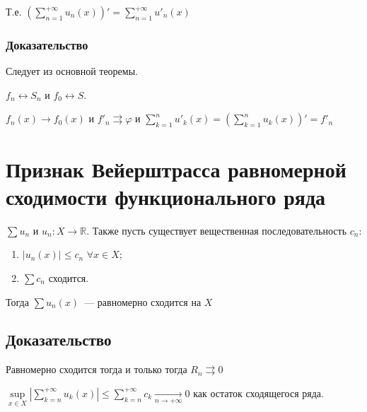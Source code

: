 \documentclass{article}
\begin{document}
            Т.е. $\left( \sum\limits^{+\infty}_{n = 1} u_n(x) \right)' = \sum\limits^{+\infty}_{n = 1} u'_n(x)$
            
        \subsubsection{Доказательство}
            
            Следует из основной теоремы.
                
            $f_n \leftrightarrow S_n$ и $f_0 \leftrightarrow S$.
                
            $f_n(x) \rightarrow f_0(x)$ и $f'_n \rightrightarrows \varphi$ и $\sum\limits^n_{k = 1} u'_k(x) = \left( \sum\limits^n_{k = 1} u_k(x) \right)' = f'_n$
                
    \newpage
    
    \section{Признак Вейерштрасса равномерной сходимости функционального ряда}
    
        $\sum u_n$ и $u_n : X \rightarrow \mathbb{R}$. Также пусть существует вещественная последовательность $c_n$:
        
        \begin{enumerate}
        
            \item $| u_n(x) | \leq c_n$ $\forall x \in X$;
            
            \item $\sum c_n$ сходится.
            
        \end{enumerate}
        
        Тогда $\sum u_n(x)$~--- равномерно сходится на $X$
        
        \subsection{Доказательство}
        
            Равномерно сходится тогда и только тогда $R_n \rightrightarrows 0$
            
            $\sup\limits_{x \in X} \left| \sum\limits^{+\infty}_{k = n} u_k(x) \right| \leq \sum\limits^{+\infty}_{k = n} c_k \xrightarrow[n \rightarrow +\infty]{} 0$ как остаток сходящегося ряда.
        
\end{document}
